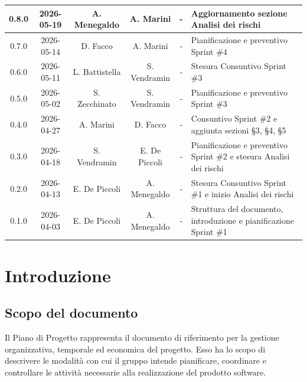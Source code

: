 \documentclass[a4paper, 10pt, colorlinks=true, linkcolor=black, urlcolor=blue, citecolor=blue, hidelinks]{article}
\begin{document}
\begin{center}
\begin{tabularx}{\textwidth}{|c|c|c|c|c|X|}
        \hline
        0.8.0 & 2026-05-19 & A. Menegaldo & A. Marini & - & Aggiornamento sezione Analisi dei rischi\\
        \hline
        0.7.0 & 2026-05-14 & D. Facco & A. Marini & - & Pianificazione e preventivo Sprint \#4 \\
        \hline
        0.6.0 & 2026-05-11 & L. Battistella & S. Vendramin & - & Stesura Consuntivo Sprint \#3 \\
        \hline
        0.5.0 & 2026-05-02 & S. Zecchinato & S. Vendramin & - & Pianificazione e preventivo Sprint \#3 \\
        \hline
        0.4.0 & 2026-04-27 & A. Marini & D. Facco & - & Consuntivo Sprint \#2 e aggiunta sezioni \S3, \S4, \S5 \\
        \hline
        0.3.0 & 2026-04-18 & S. Vendramin & E. De Piccoli & - & Pianificazione e preventivo Sprint \#2 e stesura Analisi dei rischi \\
        \hline
        0.2.0 & 2026-04-13 & E. De Piccoli & A. Menegaldo & - & Stesura Consuntivo Sprint \#1 e inizio Analisi dei rischi \\
        \hline
        0.1.0 & 2026-04-03 & E. De Piccoli & A. Menegaldo & - & Struttura del documento, introduzione e pianificazione Sprint \#1 \\
        \hline
    \end{tabularx}
\end{center}
\newpage

\newpage
{} %
\tableofcontents
\newpage
\newpage



\newpage

\section{Introduzione}

\subsection{Scopo del documento}

Il Piano di Progetto rappresenta il documento di riferimento per la gestione organizzativa, temporale ed economica del progetto. 
Esso ha lo scopo di descrivere le modalità con cui il gruppo intende pianificare, coordinare e controllare le attività necessarie alla realizzazione del prodotto software.
\end{document}
